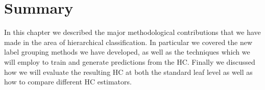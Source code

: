 \documentclass[../thesis.tex]{subfiles}
\begin{document}
\section{Summary}
In this chapter we described the major methodological contributions that we have made in the area of hierarchical classification. In particular we covered the new label grouping methods we have developed, as well as the techniques which we will employ to train and generate predictions from the HC. Finally we discussed how we will evaluate the resulting HC at both the standard leaf level as well as how to compare different HC estimators.
\end{document}
